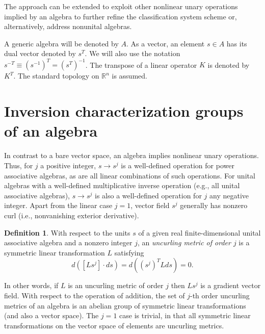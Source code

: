 \documentclass{amsart}
\numberwithin{equation}{section}
\theoremstyle{definition}
\newtheorem{definition}{Definition}[section]
\numberwithin{theorem}{section}
\begin{document}
  The approach can be extended to exploit other nonlinear unary operations implied by an algebra to further refine the classification system scheme or, alternatively, address nonunital algebras.
      
      
  
  \bigskip
  
     A generic algebra will be denoted by $A$.  As a vector, an element $s\in A$ has its dual vector denoted by $s^T$.  We will also use the notation $s^{-T} \equiv (s^{-1})^T = (s^T)^{-1}$.  The transpose of a linear operator $K$ is denoted by $K^T$.  The standard topology on $\mathbb{R}^n$ is assumed.
   
   \section{Inversion characterization groups of an algebra}

  In contrast to a bare vector space, an algebra implies nonlinear unary operations.  Thus, for $j$ a positive integer, $s\rightarrow s^j$ is a well-defined operation for power associative algebras, as are all linear combinations of such operations.  For unital algebras with a well-defined multiplicative inverse operation (e.g., all unital associative algebras), $s\rightarrow s^j$ is also a well-defined operation for $j$ any negative integer.   Apart from the linear case $j=1$, vector field $s^j$ generally has nonzero curl (i.e., nonvanishing exterior derivative).    
   
   \begin{definition} With respect to the units $s$ of a given real finite-dimensional unital associative algebra and a nonzero integer $j$, an {\it uncurling metric of order $j$} is a symmetric linear transformation $L$ satisfying \begin{equation}\nonumber d([Ls^j]\cdot ds) = d\left((s^j)^T L ds\right) = 0. \end{equation}   \end{definition}
   
   In other words, if $L$ is an uncurling metric of order $j$ then $Ls^j$ is a gradient vector field.        With respect to the operation of addition, the set of $j$-th order uncurling metrics of an algebra is an abelian group of symmetric linear transformations (and also a vector space).   The $j=1$ case is trivial, in that all symmetric linear transformations on the vector space of elements are uncurling metrics.
   
\end{document}
